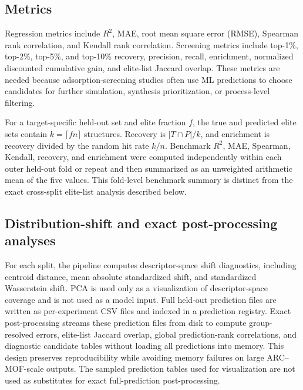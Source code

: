 \documentclass[11pt,a4paper]{article}
\begin{document}
\subsection*{Metrics}
Regression metrics include $R^2$, MAE, root mean square error (RMSE), Spearman rank correlation, and Kendall rank correlation. Screening metrics include top-1\%, top-2\%, top-5\%, and top-10\% recovery, precision, recall, enrichment, normalized discounted cumulative gain, and elite-list Jaccard overlap. These metrics are needed because adsorption-screening studies often use ML predictions to choose candidates for further simulation, synthesis prioritization, or process-level filtering.

For a target-specific held-out set and elite fraction $f$, the true and predicted elite sets contain $k=\lceil fn\rceil$ structures. Recovery is $|T\cap P|/k$, and enrichment is recovery divided by the random hit rate $k/n$. Benchmark $R^2$, MAE, Spearman, Kendall, recovery, and enrichment were computed independently within each outer held-out fold or repeat and then summarized as an unweighted arithmetic mean of the five values. This fold-level benchmark summary is distinct from the exact cross-split elite-list analysis described below.

\subsection*{Distribution-shift and exact post-processing analyses}
For each split, the pipeline computes descriptor-space shift diagnostics, including centroid distance, mean absolute standardized shift, and standardized Wasserstein shift. PCA is used only as a visualization of descriptor-space coverage and is not used as a model input. Full held-out prediction files are written as per-experiment CSV files and indexed in a prediction registry. Exact post-processing streams these prediction files from disk to compute group-resolved errors, elite-list Jaccard overlap, global prediction-rank correlations, and diagnostic candidate tables without loading all predictions into memory. This design preserves reproducibility while avoiding memory failures on large ARC--MOF-scale outputs. The sampled prediction tables used for visualization are not used as substitutes for exact full-prediction post-processing.
\end{document}
